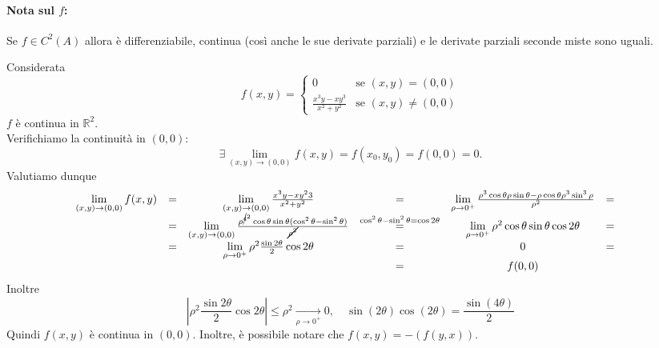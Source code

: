 \paragraph{Nota sul $f$:} Se $f\in C^2(A)$ allora è differenziabile, continua (così anche le sue derivate parziali) e le derivate parziali seconde miste sono uguali.

\begin{example}
	Considerata
	\begin{equation*}
		f(x,y)=
		\begin{cases}
			0&\text{se } (x,y)=(0,0)\\
			\frac{x^3y-xy^3}{x^2+y^2}&\text{se }(x,y)\neq(0,0)
		\end{cases}
	\end{equation*}
	$f$ è continua in $\mathbb{R}^2$.\\
	Verifichiamo la continuità in $(0,0)$:
	\begin{equation*}
		\exists\lim_{(x,y)\rightarrow(0,0)}f(x,y)=f(x_0,y_0)=f(0,0)=0.
	\end{equation*}
	Valutiamo dunque
	\begin{equation*}
		\begin{matrix}
			\lim\limits_{(x,y) \rightarrow(0,0)}f(x,y) &=& \lim\limits_{(x,y) \rightarrow(0,0)}\frac{x^3y-xy^2
			3}{x^2+y^2} &=& \lim\limits_{\rho\rightarrow0^+}\frac{\rho^3 \cos\theta\rho\sin\theta-\rho\cos\theta\rho^3\sin^3\rho}{\rho^2}
			&=&\\
			&=& \lim\limits_{(x,y) \rightarrow(0,0)}\frac{\rho^{\cancel{4}^2}\cos\theta\sin\theta(\cos^2\theta-\sin^2\theta)}{\cancel{\rho^2}}
			&\overset{\cos^2\theta-\sin^2\theta = \cos2\theta}{=}& \lim\limits_{\rho \rightarrow 0^+}\rho^2\cos\theta\sin\theta\cos2\theta &=&\\
			&=& \lim\limits_{\rho \rightarrow 0^+}\rho^2\frac{\sin2\theta}{2}\cos2\theta &=& 0 &=&\\
			&&&=&f(0,0)
		\end{matrix}
	\end{equation*}
	Inoltre
	\begin{equation*}
		\left|\rho^2\frac{\sin2\theta}{2}\cos2\theta\right|\leq \rho^2\underset{\rho\rightarrow 0^+}{\longrightarrow} 0,\quad \sin(2\theta)\cos(2\theta)=\frac{\sin(4\theta)}{2}
	\end{equation*}
	Quindi $f(x,y)$ è continua in $(0,0)$. Inoltre, è possibile notare che $f(x,y)=-(f(y,x))$.

\end{example}
